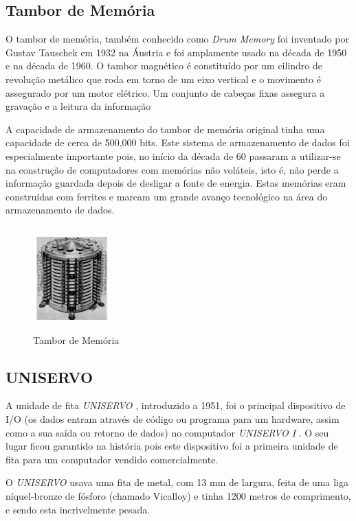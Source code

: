 \documentclass{report}
\begin{document}
		
		\subsection{Tambor de Memória}
		 O tambor de memória, também conhecido como\textit{ Drum Memory} foi inventado por Gustav Tauschek em 1932 na Áustria e foi amplamente usado na década de 1950 e na década de 1960.
		 O tambor magnético é constituído por um cilindro de revolução metálico que roda em torno de um eixo vertical e o movimento é assegurado por um motor elétrico. Um conjunto de cabeças fixas assegura a gravação e a leitura da informação
		 
		 A capacidade de armazenamento do tambor de memória original tinha uma capacidade de cerca de 500,000 bits. Este sistema de armazenamento de dados foi especialmente importante pois, no início da década de 60 passaram a utilizar-se na construção de computadores com memórias não voláteis, isto é, não perde a informação guardada depois de desligar a fonte de energia. Estas memórias eram construídas com ferrites e marcam um grande avanço tecnológico na área do armazenamento de dados.
	
	\begin{figure}[h]
		\centering
		\includegraphics[width=3cm, height=4cm]{tambordememoria.jpg}
		\caption{Tambor de Memória}
		\end{figure}

\subsection{UNISERVO}

	A unidade de fita \textit{UNISERVO}  , introduzido a 1951, foi o principal dispositivo de I/O (os dados entram através de código ou programa para um hardware, assim como a sua saída ou retorno de dados) no computador \textit{UNISERVO I} . O seu lugar ficou garantido na história pois este dispositivo foi a primeira unidade de fita para um computador vendido comercialmente. 
\vspace{1mm}	
	
	O \textit{UNISERVO}  usava uma fita de metal, com 13 mm de largura, feita de uma liga níquel-bronze de fósforo (chamado Vicalloy) e tinha 1200 metros de comprimento, e sendo esta incrivelmente pesada.
\vspace{1mm}
	
\end{document}
